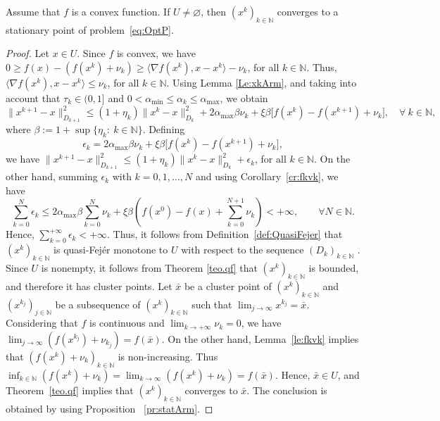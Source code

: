 \begin{corollary} \label{cor:xkquasifeArm}
	Assume that $f$ is a convex function. If $U \neq \varnothing$, then $(x^k)_{k\in\mathbb{N}}$ converges to a stationary point of problem~\eqref{eq:OptP}.
\end{corollary}
\begin{proof}
	Let $x \in U$.  Since  $f$ is convex, we have $0\geq f(x)-(f(x^k)+\nu_k)\geq \langle \nabla f(x^k),x-x^k\rangle -\nu_k$, for all $k\in \mathbb{N}$. Thus, $\langle \nabla f(x^k),x-x^k\rangle\leq \nu_k$, for all $k\in \mathbb{N}$.   Using Lemma \ref{Le:xkArm},  and taking into account  that  $\tau_k \in (0, 1]$  and  $0<\alpha_{\min}\leq \alpha_k \leq \alpha_{\max}$,  we obtain
	{
	$$
		\|x^{k+1}-x\|_{D_{k+1}}^2 \leq (1+\eta_k)\|x^k-x\|_{D_k}^2+2 \alpha_{\max}\beta \nu_k+ \xi \beta \big[f(x^k) - f(x^{k+1}) +\nu_k\big], \quad \forall~k \in \mathbb{N},
	$$
	where $\beta:=1+\sup\{\eta_k:~k\in\mathbb{N}\} $.
	Defining 
	$$
	  \epsilon_k =  2 \alpha_{\max} \beta \nu_k + \xi \beta\big[f(x^k) - f(x^{k+1}) +\nu_k\big],
	$$ 
	we have $\|x^{k+1}-x\|_{D_{k+1}}^2 \leq (1+\eta_k)\|x^k-x\|_{D_k}^2+ \epsilon_k$, for all $k \in \mathbb{N}$}. On the other hand, summing $\epsilon_k$ with $k = 0, 1, \ldots, N$ and using  Corollary~\ref{cr:fkvk},  we have
	{
		$$
			\sum_{k=0}^N \epsilon_k \leq 2   \alpha_{\max} \beta \sum_{k=0}^N \nu_k +  \xi \beta\left(f(x^0) - f(x) + \sum_{k=0}^{N+1} \nu_k \right) < +\infty, \qquad \forall N \in \mathbb{N}.
		$$
	}
	Hence, $\sum_{k=0}^{+\infty} \epsilon_k<+\infty$.  Thus, it follows from  Definition~\ref{def:QuasiFejer}  that $(x^k)_{k\in\mathbb{N}}$ is quasi-Fej\'er monotone to $U$ with respect to the sequence  $(D_k)_{k\in\mathbb{N}}$ . Since  $U$ is nonempty, it follows from Theorem \ref{teo.qf} that $(x^k)_{k\in\mathbb{N}}$ is bounded, and therefore it has cluster points. Let $\bar{x}$ be a cluster point of $(x^k)_{k\in\mathbb{N}}$ and $(x^{k_j})_{j\in\mathbb{N}}$ be a subsequence of $(x^k)_{k\in\mathbb{N}}$ such that $\lim_{j \to \infty} x^{k_j} = \bar{x}$. Considering that $f$ is continuous and $\lim_{k\to +\infty} \nu_{k} = 0$, we have $\lim_{j \to \infty} (f(x^{k_j})+\nu_{k_j})= f(\bar{x})$.  On the other hand, Lemma~\ref{le:fkvk} implies that  $\left(f(x^k)+\nu_k\right)_{k\in\mathbb{N}}$ is  non-increasing. Thus  $\inf_{k\in {\mathbb N}}(f(x^{k})+\nu_k)= \lim_{k \to \infty} (f(x^{k})+\nu_{k}) = f(\bar{x}).$ Hence, $\bar{x} \in U$, and  Theorem~\ref{teo.qf}  implies that $(x^k)_{k\in\mathbb{N}}$ converges to $\bar{x}$.  The conclusion is obtained  by  using   Proposition ~\ref{pr:statArm}.
\end{proof}

